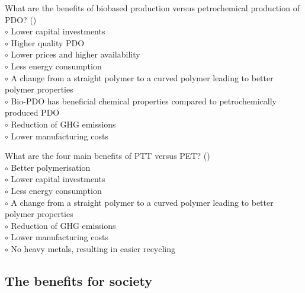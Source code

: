 \documentclass[]{beamer}
\begin{document}
\begin{CJK}{UTF8}{gbsn}
\begin{frame}[shrink] {} 
\addtocounter{questions}{1}
\color{blue}
  What are the benefits of biobased production versus petrochemical production of PDO?
 ({})\\
\color{black}
\setlength{\parindent}{-0.4cm}
{\color{red}$\circ$}  Lower capital investments  \\
{\color{red}$\circ$} Higher quality PDO   \\
{\color{red}$\circ$}  Lower prices and higher availability  \\
{\color{red}$\circ$}  Less energy consumption  \\
{\color{red}$\circ$} A change from a straight polymer to a curved polymer leading to better polymer properties  \\
{\color{red}$\circ$} Bio-PDO has beneficial chemical properties compared to petrochemically produced PDO  \\
{\color{red}$\circ$}  Reduction of GHG emissions  \\
{\color{red}$\circ$}  Lower manufacturing costs  \\
\end{frame}


\begin{frame}[shrink] {} 
\addtocounter{questions}{1}
\color{blue}
  What are the four main benefits of PTT versus PET?
 ({})\\
\color{black}
\setlength{\parindent}{-0.4cm}
{\color{red}$\circ$}  Better polymerisation   \\
{\color{red}$\circ$} Lower capital investments  \\
{\color{red}$\circ$}  Less energy consumption  \\
{\color{red}$\circ$}  A change from a straight polymer to a curved polymer leading to better polymer properties  \\
{\color{red}$\circ$} Reduction of GHG emissions  \\
{\color{red}$\circ$} Lower manufacturing costs  \\
{\color{red}$\circ$}  No heavy metals, resulting in easier recycling  \\

\end{frame}


\subsection{The benefits for society}
\setcounter{questions}{0}



\end{CJK}
\end{document}
